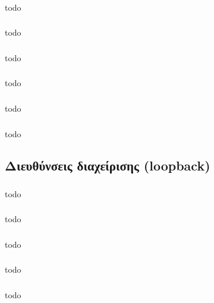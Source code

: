 \documentclass[a4paper, 12pt]{article}
\begin{document}
		\subsubsection{}
			todo

		\subsubsection{}
			todo

		\subsubsection{}
			todo

		\subsubsection{}
			todo

		\subsubsection{}
			todo

		\subsubsection{}
			todo

	\subsection{Διευθύνσεις διαχείρισης (loopback)}

		\subsubsection{}
			todo

		\subsubsection{}
			todo

		\subsubsection{}
			todo

		\subsubsection{}
			todo

		\subsubsection{}
			todo
\end{document}
